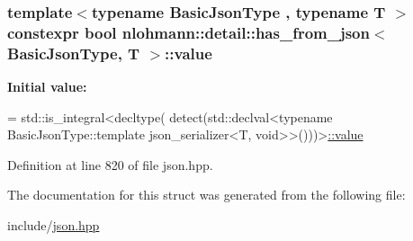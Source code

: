 \subsubsection[{\texorpdfstring{value}{value}}]{\setlength{\rightskip}{0pt plus 5cm}template$<$typename Basic\+Json\+Type , typename T $>$ constexpr bool {\bf nlohmann\+::detail\+::has\+\_\+from\+\_\+json}$<$ Basic\+Json\+Type, T $>$\+::value\hspace{0.3cm}{\ttfamily [static]}}\hypertarget{structnlohmann_1_1detail_1_1has__from__json_a16701d806343c58ae7e884024dd14955}{}\label{structnlohmann_1_1detail_1_1has__from__json_a16701d806343c58ae7e884024dd14955}
{\bfseries Initial value\+:}
\begin{DoxyCode}
= std::is\_integral<decltype(
                                      detect(std::declval<\textcolor{keyword}{typename} BasicJsonType::template 
      json\_serializer<T, void>>()))>\hyperlink{structnlohmann_1_1detail_1_1has__from__json_a16701d806343c58ae7e884024dd14955}{::value}
\end{DoxyCode}


Definition at line 820 of file json.\+hpp.



The documentation for this struct was generated from the following file\+:\begin{DoxyCompactItemize}
\item 
include/\hyperlink{json_8hpp}{json.\+hpp}\end{DoxyCompactItemize}

